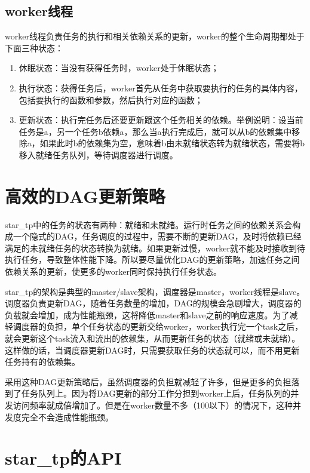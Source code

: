 \subsection{worker线程}

worker线程负责任务的执行和相关依赖关系的更新，worker的整个生命周期都处于下面三种状态：

\begin{enumerate}
	\item 休眠状态：当没有获得任务时，worker处于休眠状态；
	\item 执行状态：获得任务后，worker首先从任务中获取要执行的任务的具体内容，包括要执行的函数和参数，然后执行对应的函数；
	\item 更新状态：执行完任务后还要更新跟这个任务相关的依赖。举例说明：设当前任务是a，另一个任务b依赖a，那么当a执行完成后，就可以从b的依赖集中移除a，如果此时b的依赖集为空，意味着b由未就绪状态转为就绪状态，需要将b移入就绪任务队列，等待调度器进行调度。
\end{enumerate}

\section{高效的DAG更新策略}

star\_tp中的任务的状态有两种：就绪和未就绪。运行时任务之间的依赖关系会构成一个隐式的DAG，任务调度的过程中，需要不断的更新DAG，及时将依赖已经满足的未就绪任务的状态转换为就绪。如果更新过慢，worker就不能及时接收到待执行任务，导致整体性能下降。所以要尽量优化DAG的更新策略，加速任务之间依赖关系的更新，使更多的worker同时保持执行任务状态。

star\_tp的架构是典型的master/slave架构，调度器是master，worker线程是slave。调度器负责更新DAG，随着任务数量的增加，DAG的规模会急剧增大，调度器的负载就会增加，成为性能瓶颈，这将降低master和slave之前的响应速度。为了减轻调度器的负担，单个任务状态的更新交给worker，worker执行完一个task之后，就会更新这个task流入和流出的依赖集，从而更新任务的状态（就绪或未就绪）。这样做的话，当调度器更新DAG时，只需要获取任务的状态就可以，而不用更新任务持有的依赖集。

采用这种DAG更新策略后，虽然调度器的负担就减轻了许多，但是更多的负担落到了任务队列上。因为将DAG更新的部分工作分担到worker上后，任务队列的并发访问频率就成倍增加了。但是在worker数量不多（100以下）的情况下，这种并发度完全不会造成性能瓶颈。

\section{star\_tp的API}

